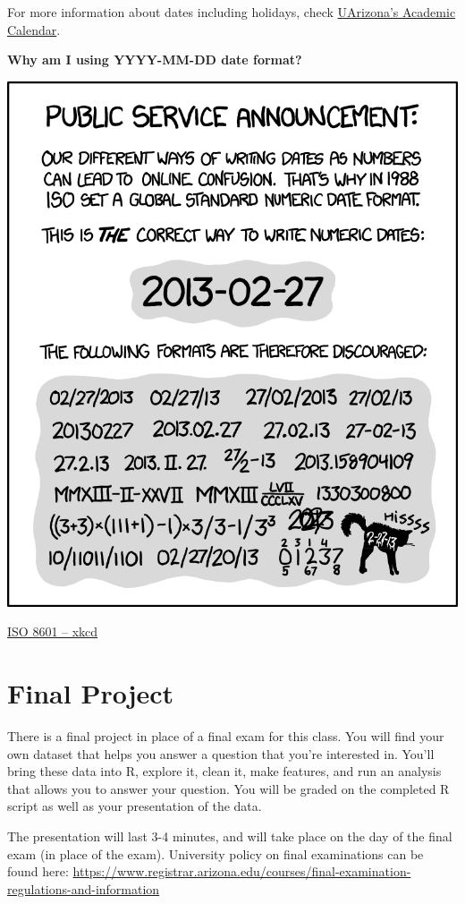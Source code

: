 \documentclass[
]{book}
\begin{document}
For more information about dates including holidays, check \href{https://catalog.arizona.edu/calendar/2020-2021-academic-calendar}{UArizona's Academic Calendar}.

\textbf{Why am I using YYYY-MM-DD date format?}

\includegraphics[width=10.89in]{images/iso_8601_2x}

\href{https://xkcd.com/1179/}{ISO 8601 -- xkcd}

\hypertarget{final-project}{%
\section{Final Project}\label{final-project}}

There is a final project in place of a final exam for this class. You will find your own dataset that helps you answer a question that you're interested in. You'll bring these data into R, explore it, clean it, make features, and run an analysis that allows you to answer your question. You will be graded on the completed R script as well as your presentation of the data.

The presentation will last 3-4 minutes, and will take place on the day of the final exam (in place of the exam). University policy on final examinations can be found here: \url{https://www.registrar.arizona.edu/courses/final-examination-regulations-and-information}
\end{document}
